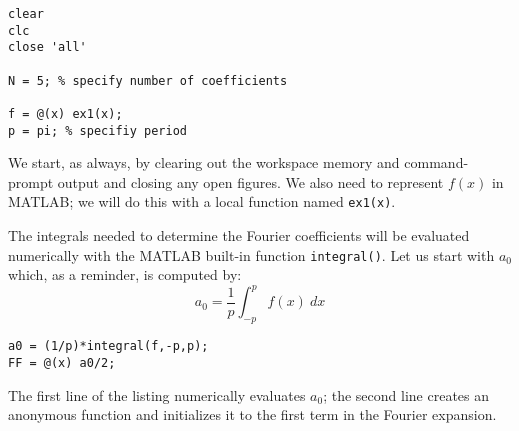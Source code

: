 \begin{lstlisting}[name=lec17-ex1,style=myMatlab]
clear
clc
close 'all'

N = 5; % specify number of coefficients

f = @(x) ex1(x); 
p = pi; % specifiy period
\end{lstlisting}
We start, as always, by clearing out the workspace memory and command-prompt output and closing any open figures.  We also need to represent $f(x)$ in MATLAB; we will do this with a local function named \lstinline{ex1(x)}.  

The integrals needed to determine the Fourier coefficients will be evaluated numerically with the MATLAB built-in function \lstinline{integral()}. Let us start with $a_0$ which, as a reminder, is computed by:
\begin{equation*}
a_0 = \frac{1}{p}\int_{-p}^{p} f(x) \ dx
\end{equation*}

\begin{lstlisting}[name=lec17-ex1,style=myMatlab]
a0 = (1/p)*integral(f,-p,p);
FF = @(x) a0/2;
\end{lstlisting}
The first line of the listing numerically evaluates $a_0$; the second line creates an anonymous function and initializes it to the first term in the Fourier expansion.

